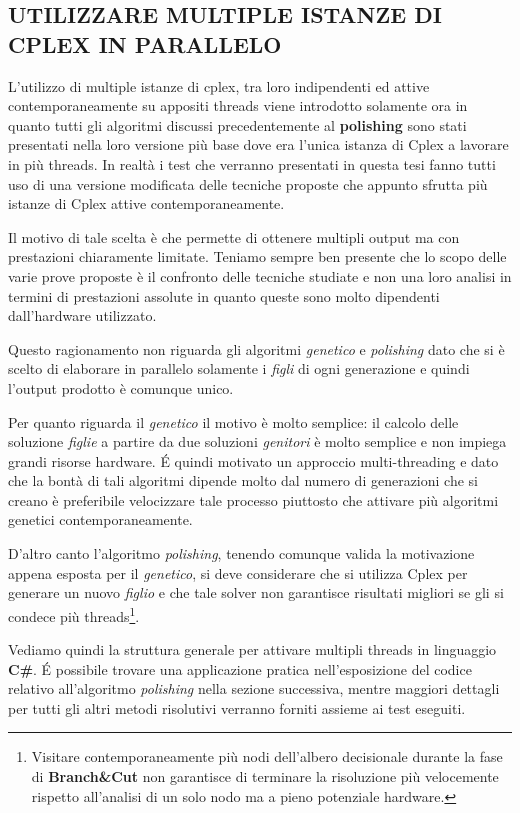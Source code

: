 \documentclass[11pt]{article}
\begin{document}
\subsection*{UTILIZZARE MULTIPLE ISTANZE DI CPLEX IN PARALLELO}
\label{sec:ParCplexS}

L'utilizzo di multiple istanze di cplex, tra loro indipendenti ed attive contemporaneamente su appositi threads viene introdotto solamente ora in quanto tutti gli algoritmi discussi precedentemente al \textbf{polishing} sono stati presentati nella loro versione più base dove era l'unica istanza di Cplex a lavorare in più threads. In realtà i test che verranno presentati in questa tesi fanno tutti uso di una versione modificata delle tecniche proposte che appunto sfrutta più istanze di Cplex attive contemporaneamente.

Il motivo di tale scelta è che permette di ottenere multipli output ma con prestazioni chiaramente limitate. Teniamo sempre ben presente che lo scopo delle varie prove proposte è il confronto delle tecniche studiate e non una loro analisi in termini di prestazioni assolute in quanto queste sono molto dipendenti dall'hardware utilizzato.

Questo ragionamento non riguarda gli algoritmi \textit{genetico} e \textit{polishing} dato che si è scelto di elaborare in parallelo solamente i \textit{figli} di ogni generazione e quindi l'output prodotto è comunque unico.

Per quanto riguarda il \textit{genetico} il motivo è molto semplice: il calcolo delle soluzione \textit{figlie} a partire da due soluzioni \textit{genitori} è molto semplice e non impiega grandi risorse hardware. \'E quindi motivato un approccio multi-threading e dato che la bontà di tali algoritmi dipende molto dal numero di generazioni che si creano è preferibile velocizzare tale processo piuttosto che attivare più algoritmi genetici contemporaneamente.

D'altro canto l'algoritmo \textit{polishing}, tenendo comunque valida la motivazione appena esposta per il \textit{genetico}, si deve considerare che si utilizza Cplex per generare un nuovo \textit{figlio} e che tale solver non garantisce risultati migliori se gli si condece più threads\footnote{Visitare contemporaneamente più nodi dell'albero decisionale durante la fase di \textbf{Branch\&Cut} non garantisce di terminare la risoluzione più velocemente rispetto all'analisi di un solo nodo ma a pieno potenziale hardware.}.

Vediamo quindi la struttura generale per attivare multipli threads in linguaggio \textbf{C\#}. \'E possibile trovare una applicazione pratica nell'esposizione del codice relativo all'algoritmo \textit{polishing} nella sezione successiva, mentre maggiori dettagli per tutti gli altri metodi risolutivi verranno forniti assieme ai test eseguiti.
\end{document}
